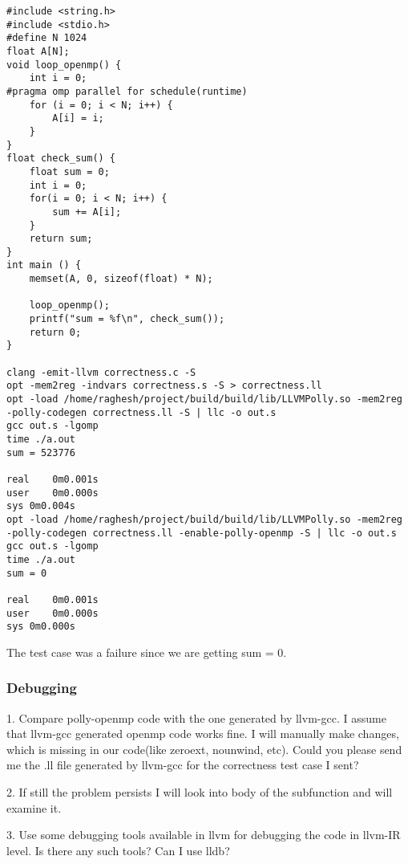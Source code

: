 \documentclass[a4paper,10pt]{article}
\begin{document}
\begin{verbatim}
#include <string.h>
#include <stdio.h>
#define N 1024
float A[N];
void loop_openmp() {
    int i = 0;
#pragma omp parallel for schedule(runtime)
    for (i = 0; i < N; i++) {
        A[i] = i;
    }
}
float check_sum() {
    float sum = 0;
    int i = 0;
    for(i = 0; i < N; i++) {
        sum += A[i];
    }
    return sum;
}
int main () {
    memset(A, 0, sizeof(float) * N);

    loop_openmp();
    printf("sum = %f\n", check_sum());
    return 0;
}

clang -emit-llvm correctness.c -S
opt -mem2reg -indvars correctness.s -S > correctness.ll
opt -load /home/raghesh/project/build/build/lib/LLVMPolly.so -mem2reg -polly-codegen correctness.ll -S | llc -o out.s
gcc out.s -lgomp
time ./a.out
sum = 523776

real	0m0.001s
user	0m0.000s
sys	0m0.004s
opt -load /home/raghesh/project/build/build/lib/LLVMPolly.so -mem2reg -polly-codegen correctness.ll -enable-polly-openmp -S | llc -o out.s
gcc out.s -lgomp
time ./a.out
sum = 0

real	0m0.001s
user	0m0.000s
sys	0m0.000s

\end{verbatim}

The test case was a failure since we are getting sum = 0.

\subsubsection{Debugging}
1. Compare polly-openmp code with the one generated by llvm-gcc. I assume that llvm-gcc generated openmp code works fine. I will manually make changes, which is missing in our code(like zeroext, nounwind, etc). Could you please send me the .ll file generated by llvm-gcc for the correctness test case I sent?

2. If still the problem persists I will look into body of the subfunction and will examine it.

3. Use some debugging tools available in llvm for debugging the code in llvm-IR level. Is there any such tools? Can I use lldb?
\end{document}
